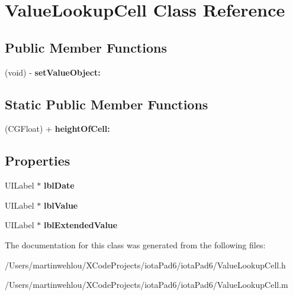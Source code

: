 \hypertarget{interface_value_lookup_cell}{
\section{ValueLookupCell Class Reference}
\label{interface_value_lookup_cell}
}
\subsection*{Public Member Functions}
\begin{DoxyCompactItemize}
\item 
\hypertarget{interface_value_lookup_cell_a13326dd5765f5ba4b39103600930ecc7}{
(void) -\/ {\bfseries setValueObject:}}
\label{interface_value_lookup_cell_a13326dd5765f5ba4b39103600930ecc7}

\end{DoxyCompactItemize}
\subsection*{Static Public Member Functions}
\begin{DoxyCompactItemize}
\item 
\hypertarget{interface_value_lookup_cell_a3190ad88282e43254c3a336b1cf13cee}{
(CGFloat) + {\bfseries heightOfCell:}}
\label{interface_value_lookup_cell_a3190ad88282e43254c3a336b1cf13cee}

\end{DoxyCompactItemize}
\subsection*{Properties}
\begin{DoxyCompactItemize}
\item 
\hypertarget{interface_value_lookup_cell_ae9646d7905b62badf03e6ffbe6ca3a7f}{
UILabel $\ast$ {\bfseries lblDate}}
\label{interface_value_lookup_cell_ae9646d7905b62badf03e6ffbe6ca3a7f}

\item 
\hypertarget{interface_value_lookup_cell_adcd18657ee1b0667dc8eea738c2128e9}{
UILabel $\ast$ {\bfseries lblValue}}
\label{interface_value_lookup_cell_adcd18657ee1b0667dc8eea738c2128e9}

\item 
\hypertarget{interface_value_lookup_cell_a0049c040e91e6591189ea1ffb1290428}{
UILabel $\ast$ {\bfseries lblExtendedValue}}
\label{interface_value_lookup_cell_a0049c040e91e6591189ea1ffb1290428}

\end{DoxyCompactItemize}


The documentation for this class was generated from the following files:\begin{DoxyCompactItemize}
\item 
/Users/martinwehlou/XCodeProjects/iotaPad6/iotaPad6/ValueLookupCell.h\item 
/Users/martinwehlou/XCodeProjects/iotaPad6/iotaPad6/ValueLookupCell.m\end{DoxyCompactItemize}
